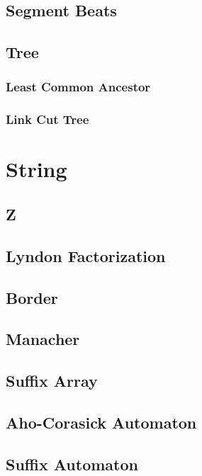 \documentclass{article}
\begin{document}
\begin{multicols}{2}
    \subsection{Segment Beats}
    
    \subsection{Tree}
    \subsubsection{Least Common Ancestor}
    
    \subsubsection{Link Cut Tree}
    


    \section{String}
    \subsection{Z}
    
    \subsection{Lyndon Factorization}
    
    \subsection{Border}
    
    \subsection{Manacher}
    
    \subsection{Suffix Array}
    
    \subsection{Aho-Corasick Automaton}
    
    \subsection{Suffix Automaton}
    

\end{multicols}
\end{document}
